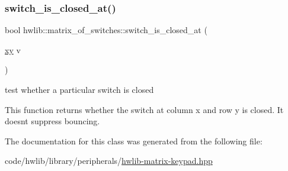 \subsubsection{\texorpdfstring{switch\+\_\+is\+\_\+closed\+\_\+at()}{switch\_is\_closed\_at()}}
{\footnotesize\ttfamily bool hwlib\+::matrix\+\_\+of\+\_\+switches\+::switch\+\_\+is\+\_\+closed\+\_\+at (\begin{DoxyParamCaption}\item[{\hyperlink{classhwlib_1_1xy}{xy}}]{v }\end{DoxyParamCaption})\hspace{0.3cm}{\ttfamily [inline]}}



test whether a particular switch is closed 

This function returns whether the switch at column x and row y is closed. It doesn\textquotesingle{}t suppress bouncing. 

The documentation for this class was generated from the following file\+:\begin{DoxyCompactItemize}
\item 
code/hwlib/library/peripherals/\hyperlink{hwlib-matrix-keypad_8hpp}{hwlib-\/matrix-\/keypad.\+hpp}\end{DoxyCompactItemize}
